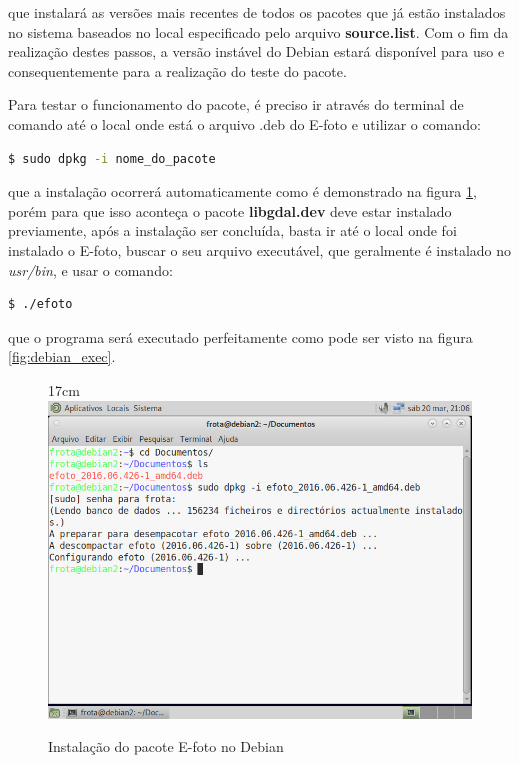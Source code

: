 que instalará as versões mais recentes de todos os pacotes que já estão instalados no sistema baseados no local especificado pelo arquivo \textbf{source.list}. Com o fim da realização destes passos, a versão instável do Debian estará disponível para uso e consequentemente para a realização do teste do pacote.

Para testar o funcionamento do pacote, é preciso ir através do terminal de comando até o local onde está o arquivo .deb do E-foto e utilizar o comando:

\begin{lstlisting}[language=bash]
	$ sudo dpkg -i nome_do_pacote
\end{lstlisting}

que a instalação ocorrerá automaticamente como é demonstrado na figura \ref{fig:debian_insta}, porém para que isso aconteça o pacote \textbf{libgdal.dev} deve estar instalado previamente, após a instalação ser concluída, basta ir até o local onde foi instalado o E-foto, buscar o seu arquivo executável, que geralmente é instalado no \textit{usr/bin}, e usar o comando:

\begin{lstlisting}[language=bash]
	$ ./efoto
\end{lstlisting}

que o programa será executado perfeitamente como pode ser visto na figura \ref{fig:debian_exec}.

\begin{figure}[!ht]{17cm}
	\centering
	\includegraphics[width=15cm]{Figuras/debian_insta.jpg}
	\caption{Instalação do pacote E-foto no Debian} \label{fig:debian_insta}
\end{figure}

